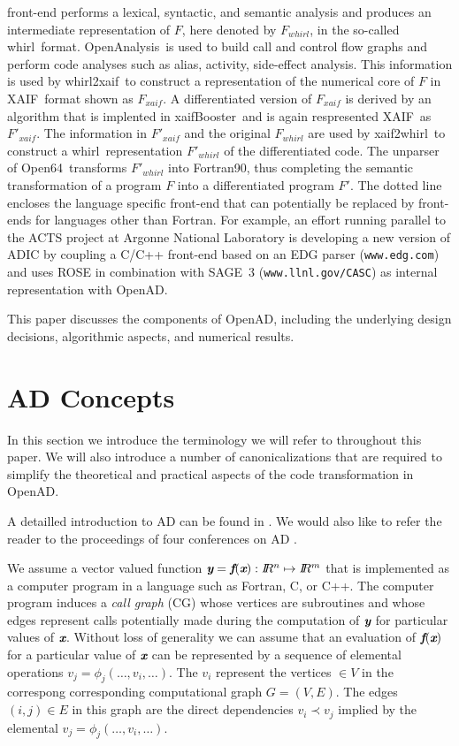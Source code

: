 \documentclass[11pt]{article}
\newcommand{\OpenAD}{OpenAD}
\newcommand{\OpenAnalysis}{OpenAnalysis}
\newcommand{\OpenSixtyFour}{Open64}
\newcommand{\xaif}{XAIF}
\newcommand{\xaifBooster}{xaifBooster}
\newcommand{\whirl}{whirl}
\newcommand{\whirlToxaif}{whirl2xaif}
\newcommand{\xaifTowhirl}{xaif2whirl}
\newcommand{\R}{I\!\!R}
\newcommand{\bmf}{\mbox{\bf\em f}}
\newcommand{\bmx}{\mbox{\bf\em x}}
\newcommand{\bmy}{\mbox{\bf\em y}}
\begin{document}
front-end performs a lexical, 
syntactic, and semantic analysis and produces an 
intermediate representation of $F$, here denoted by $F_{\whirl}$, 
in the so-called \whirl\ format.
\OpenAnalysis\ is used to build call and control flow graphs and  perform 
code analyses such as alias, activity, side-effect analysis.
This information is used by 
\whirlToxaif\ to construct a representation of the numerical core of $F$ in
\xaif\ format shown as $F_{xaif}$.  
A differentiated version of $F_{xaif}$ is derived by an 
algorithm that is implented in \xaifBooster\ and is again respresented 
\xaif\ as $F'_{xaif}$.
The information in $F'_{xaif}$ and the original $F_{\whirl}$ are used by 
\xaifTowhirl\ to construct a 
\whirl\ representation $F'_{\whirl}$ of the differentiated code. 
The unparser of 
\OpenSixtyFour\ transforms $F'_{\whirl}$ into Fortran90, thus completing
the semantic transformation of a program $F$ into
a differentiated program $F'$.
The dotted line encloses the language specific front-end that can potentially
be replaced by front-ends for languages other than Fortran. 
For example, an 
effort running parallel to the ACTS project at Argonne National Laboratory is 
developing a new version of ADIC \cite{HoNo01} by coupling a C/C++ 
front-end 
based on an EDG parser ({\tt www.edg.com}) and uses ROSE in combination with SAGE~3 ({\tt www.llnl.gov/CASC}) as internal representation
with \OpenAD.

This paper discusses the components of \OpenAD,
including the underlying design decisions, algorithmic aspects, and
numerical results.
 
\section{AD Concepts}\label{sec:ADIntro}

In this section we introduce the terminology we will refer to throughout 
this paper. We will also introduce a number of canonicalizations 
that are required to simplify the theoretical and practical 
aspects of the code transformation in \OpenAD.

A detailled introduction to AD can be found in \cite{Gri00}. 
We would also like to refer the reader to the proceedings of four conferences 
on AD \cite{CG91,BBCG96,CFG+01,BCH+05}.

We assume a vector valued function $\bmy=\bmf(\bmx): \R^n\mapsto \R^m$ that is implemented 
as a computer program in a language such as Fortran, C, or C++. 
The computer program 
induces a {\em call graph} (CG) \cite{ASU86}
whose vertices are subroutines and whose edges 
represent calls potentially made during the computation of $\bmy$ for particular 
values of $\bmx$. 
Without loss of generality we can assume that an evaluation of $\bmf(\bmx)$ for  
a particular value of $\bmx$ can be represented by a sequence of 
elemental operations $v_j=\phi_j(\ldots,v_i,\ldots)$. 
The $v_i$ represent the vertices $\in V$ in the correspong corresponding computational 
graph $G=(V,E)$. The edges $(i,j)\in E$ in this graph are the direct dependencies 
$v_i\prec v_j$ implied by the elemental $v_j=\phi_j(\ldots,v_i,\ldots)$.
\end{document}
